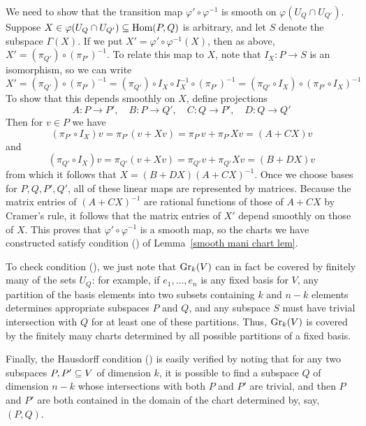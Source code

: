 \begin{example}
We need to show that the transition map $\varphi'\circ\varphi^{-1}$ is smooth on $\varphi(U_Q\cap U_{Q'})$. Suppose $X\in\varphi(U_Q\cap U_{Q'})\subseteq\mathrm{Hom}(P,Q)$ is arbitrary, and let $S$ denote the subspace $\Gamma(X)$. If we put $X'=\varphi'\circ\varphi^{-1}(X)$, then as above, $X'=(\pi_{Q'})\circ(\pi_{P'})^{-1}$. To relate this map to $X$, note that $I_X:P\to S$ is an isomorphism, so we can write
\[X'=(\pi_{Q'})\circ(\pi_{P'})^{-1}=(\pi_{Q'})\circ I_X\circ I_X^{-1}\circ (\pi_{P'})^{-1}=(\pi_{Q'}\circ I_X)\circ(\pi_{P'}\circ I_X)^{-1}\]
To show that this depends smoothly on $X$, define projections
\[A:P\to P',\quad B:P\to Q',\quad C:Q\to P',\quad D:Q\to Q'\]
Then for $v\in P$ we have
\[(\pi_{P'}\circ I_X)v=\pi_{P'}(v+Xv)=\pi_{P'}v+\pi_{P'}Xv=(A+CX)v\]
and
\[(\pi_{Q'}\circ I_X)v=\pi_{Q'}(v+Xv)=\pi_{Q'}v+\pi_{Q'}Xv=(B+DX)v\]
from which it follows that $X=(B+DX)(A+CX)^{-1}$. Once we choose bases
for $P,Q,P',Q'$, all of these linear maps are represented by matrices. Because the matrix entries of $(A+CX)^{-1}$ are rational functions of those of $A+CX$ by Cramer's rule, it follows that the matrix entries of $X'$ depend smoothly on those of $X$. This proves that $\varphi'\circ\varphi^{-1}$ is a smooth map, so the charts we have constructed satisfy condition () of Lemma~\ref{smooth mani chart lem}.\par
To check condition (), we just note that $\mathrm{Gr}_k(V)$ can in fact be covered by finitely many of the sets $U_Q$: for example, if $e_1,\dots,e_n$ is any fixed basis for $V$, any partition of the basis elements into two subsets containing $k$ and $n-k$ elements determines appropriate subspaces $P$ and $Q$, and any subspace $S$ must have trivial
intersection with $Q$ for at least one of these partitions. Thus, $\mathrm{Gr}_k(V)$ is covered by the finitely many charts determined by all possible partitions of a fixed basis.\par
Finally, the Hausdorff condition () is easily verified by noting that for any two subspaces $P,P'\subseteq V$ of dimension $k$, it is possible to find a subspace $Q$ of dimension $n-k$ whose intersections with both $P$ and $P'$ are trivial, and then $P$ and $P'$ are both contained in the domain of the chart determined by, say, $(P,Q)$.
\end{example}
